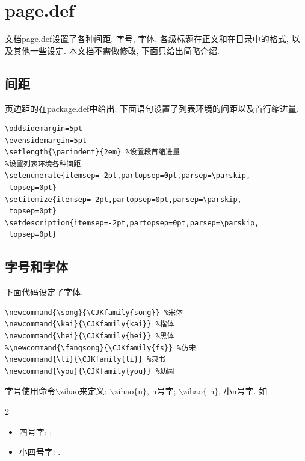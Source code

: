 \documentclass[a4paper,12pt,twoside]{ctexart}
\begin{document}
\section{page.def}
    文档page.def设置了各种间距, 字号, 字体, 各级标题在正文和在目录中的格式, 以及其他一些设定. 本文档不需做修改, 下面只给出简略介绍.
    \subsection{间距}
    页边距的在package.def中给出. 下面语句设置了列表环境的间距以及首行缩进量.
\begin{verbatim}
\oddsidemargin=5pt
\evensidemargin=5pt
\setlength{\parindent}{2em} %设置段首缩进量
%设置列表环境各种间距
\setenumerate{itemsep=-2pt,partopsep=0pt,parsep=\parskip,
 topsep=0pt}
\setitemize{itemsep=-2pt,partopsep=0pt,parsep=\parskip,
 topsep=0pt}
\setdescription{itemsep=-2pt,partopsep=0pt,parsep=\parskip,
 topsep=0pt}
\end{verbatim}\vspace*{-0pt}

\vspace*{-10pt}
    \subsection{字号和字体}
    下面代码设定了字体.\vspace*{-10pt}
    \begin{verbatim}
\newcommand{\song}{\CJKfamily{song}} %宋体
\newcommand{\kai}{\CJKfamily{kai}} %楷体
\newcommand{\hei}{\CJKfamily{hei}} %黑体
%\newcommand{\fangsong}{\CJKfamily{fs}} %仿宋
\newcommand{\li}{\CJKfamily{li}} %隶书
\newcommand{\you}{\CJKfamily{you}} %幼圆
    \end{verbatim}\vspace*{0pt}

    \vspace*{-20pt}字号使用命令$\backslash$zihao来定义: $\backslash$zihao$\{$n$\}$, n号字; $\backslash$zihao$\{$-n$\}$, 小n号字.  如
    \begin{multicols}{2}
    \begin{itemize}
    \item 四号字: ;
    \item 小四号字: .
    \end{itemize}
    \end{multicols}
\end{document}
